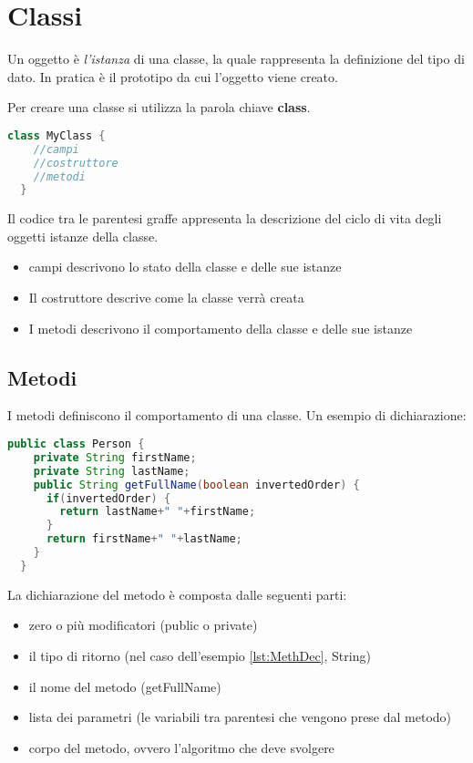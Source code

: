 \documentclass[a4paper,12pt,twoside]{book}
\begin{document}
\section{Classi}

Un oggetto è \emph{l'istanza} di una classe, la quale rappresenta la
definizione del tipo di dato. In pratica è il prototipo da cui
l'oggetto viene creato.

Per creare una classe si utilizza la parola chiave \textbf{class}.
\begin{lstlisting}[caption={Dichiarazione classe},
  label={lst:clasDec}, language=Java]
  class MyClass { 
    //campi 
    //costruttore 
    //metodi 
  }
\end{lstlisting}

Il codice tra le parentesi graffe appresenta la descrizione del ciclo
di vita degli oggetti istanze della classe.
\begin{itemize}
\item campi descrivono lo stato della classe e
  delle sue istanze
\item Il costruttore descrive come la classe verrà
  creata
\item I metodi descrivono il comportamento della
  classe e delle sue istanze
\end{itemize}

\subsection{Metodi}

I metodi definiscono il comportamento di una classe. Un esempio di
dichiarazione:

\begin{lstlisting}[caption={Definizione metodo}, label={lst:MethDec},
  language=Java]
  public class Person {
    private String firstName;
    private String lastName;
    public String getFullName(boolean invertedOrder) {
      if(invertedOrder) {
        return lastName+" "+firstName;
      }
      return firstName+" "+lastName;
    }
  }
\end{lstlisting}

La dichiarazione del metodo è composta dalle seguenti parti:
\begin{itemize}
\item zero o più modificatori (public o private)
\item il tipo di ritorno (nel caso dell'esempio \ref{lst:MethDec},
  String)
\item il nome del metodo (getFullName)
\item lista dei parametri (le variabili tra parentesi che vengono
  prese dal metodo)
\item corpo del metodo, ovvero l'algoritmo che deve svolgere
\end{itemize}
\end{document}
